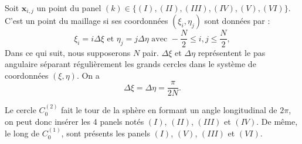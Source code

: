 Soit $\mathbf{x}_{i,j}$ un point du panel $(k) \in \lbrace (I), (II), (III), (IV), (V), (VI) \rbrace$. C'est un point du maillage si ses coordonnées $(\xi_i, \eta_j)$ sont données par :
\begin{equation}
\xi_i = i \Delta \xi \text{ et } \eta_j = j \Delta \eta \text{ avec } -\dfrac{N}{2} \leq i,j \leq \dfrac{N}{2},
\end{equation}
Dans ce qui suit, nous supposerons $N$ pair. $\Delta \xi$ et $\Delta \eta$ représentent le pas angulaire séparant régulièrement les grands cercles dans le système de coordonnées $(\xi, \eta)$. On a
\begin{equation}
\Delta \xi = \Delta \eta = \dfrac{\pi}{2N}.
\end{equation} 













Le cercle $C_0^{(2)}$ fait le tour de la sphère en formant un angle longitudinal de $2 \pi$, on peut donc insérer les 4 panels notés $(I)$, $(II)$, $(III)$ et $(IV)$. De même, le long de $C_0^{(1)}$, sont présents les panels $(I)$, $(V)$, $(III)$ et $(VI)$.

